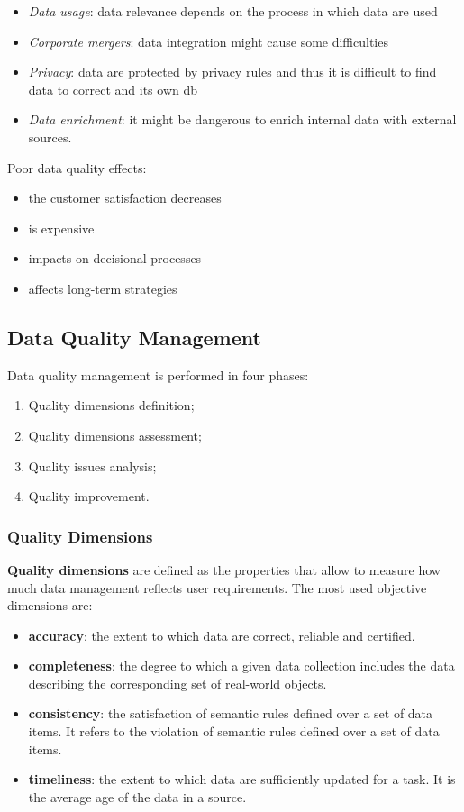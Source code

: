 \documentclass[10pt,a4paper]{article}
\begin{document}
\begin{justify}
\begin{itemize}
	\item \textit{Data usage}: data relevance depends on the process in which data are used
	\item \textit{Corporate mergers}: data integration might cause some difficulties
	\item \textit{Privacy}: data are protected by privacy rules and thus it is difficult to find data to correct and its own db
	\item \textit{Data enrichment}: it might be dangerous to enrich internal data with external sources.
\end{itemize}
Poor data quality effects:
\begin{itemize}
	\item the customer satisfaction decreases
	\item is expensive
	\item impacts on decisional processes
	\item affects long-term strategies
\end{itemize}
\subsection{Data Quality Management}
Data quality management is performed in four phases:
\begin{enumerate}
	\item Quality dimensions definition;
	\item Quality dimensions assessment;
	\item Quality issues analysis;
	\item Quality improvement.
\end{enumerate}
\subsubsection{Quality Dimensions}
\textbf{Quality dimensions} are defined as the properties that allow to measure how much data management reflects user requirements. The most used objective dimensions are:
\begin{itemize}
	\item \textbf{accuracy}: the extent to which data are correct, reliable and certified.
	\item \textbf{completeness}: the degree to which a given data collection includes the data describing the corresponding set of real-world objects.
	\item \textbf{consistency}: the satisfaction of semantic rules defined over a set of data items. It refers to the violation of semantic rules defined over a set of data items.
	\item \textbf{timeliness}: the extent to which data are sufficiently updated for a task. It is the average age of the data in a source.
\end{itemize}

\end{justify}
\end{document}
